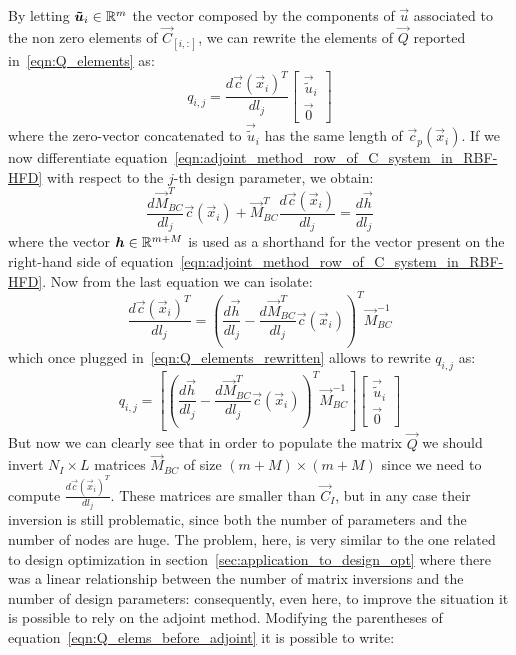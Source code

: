 By letting $\boldsymbol{\tilde{u}}_i \in \mathbb{R}^m$ the vector composed by the components of $\vec{u}$ associated to the non zero elements of $\vec{C}_{[i,:]}$, we can rewrite the elements of $\vec{Q}$ reported in~\eqref{eqn:Q_elements} as:
\begin{equation}
	\label{eqn:Q_elements_rewritten}
	q_{i,j} =
	\frac{d\vec{c}(\vec{x}_i)^T}{dl_j}
	\begin{bmatrix}
		\vec{\tilde{u}}_i  \\
		\vec{0}
	\end{bmatrix}
\end{equation}
where the zero-vector concatenated to $\vec{\tilde{u}}_i$ has the same length of $\vec{c}_p(\vec{x}_i)$.
If we now differentiate equation~\eqref{eqn:adjoint_method_row_of_C_system_in_RBF-HFD} with respect to the $j$-th design parameter, we obtain:
\begin{equation}
	\frac{d \vec{M}_{BC}^T}{d l_j} \vec{c}(\vec{x}_i) + \vec{M}_{BC}^T \frac{d \vec{c}(\vec{x}_i)}{d l_j} = \frac{d \vec{h}}{d l_j}
\end{equation}
where the vector $\boldsymbol{h} \in \mathbb{R}^{m+M}$ is used as a shorthand for the vector present on the right-hand side of equation~\eqref{eqn:adjoint_method_row_of_C_system_in_RBF-HFD}. Now from the last equation we can isolate:
\begin{equation}
	\frac{d \vec{c}(\vec{x}_i)^T}{dl_j} = \left( \frac{d \vec{h}}{d l_j} - \frac{d \vec{M}_{BC}^T}{d l_j} \vec{c}(\vec{x}_i) \right)^T \vec{M}_{BC}^{-1}
\end{equation}
which once plugged in~\eqref{eqn:Q_elements_rewritten} allows to rewrite $q_{i,j}$ as:
\begin{equation}
	\label{eqn:Q_elems_before_adjoint}
	q_{i,j} =
	\left[ \left( \frac{d \vec{h}}{d l_j} - \frac{d \vec{M}_{BC}^T}{d l_j} \vec{c}(\vec{x}_i) \right)^T \vec{M}_{BC}^{-1} \right]
	\begin{bmatrix}
		\vec{\tilde{u}}_i  \\
		\vec{0}
	\end{bmatrix}
\end{equation}
But now we can clearly see that in order to populate the matrix $\vec{Q}$ we should invert $N_I \times L$ matrices $\vec{M}_{BC}$ of size $(m+M) \times (m+M)$ since we need to compute $\frac{d \vec{c}(\vec{x}_i)^T}{dl_j}$. These matrices are smaller than $\vec{C}_I$, but in any case their inversion is still problematic, since both the number of parameters and the number of nodes are huge. The problem, here, is very similar to the one related to design optimization in section~\ref{sec:application_to_design_opt} where there was a linear relationship between the number of matrix inversions and the number of design parameters: consequently, even here, to improve the situation it is possible to rely on the adjoint method. Modifying the parentheses of equation~\eqref{eqn:Q_elems_before_adjoint} it is possible to write:
